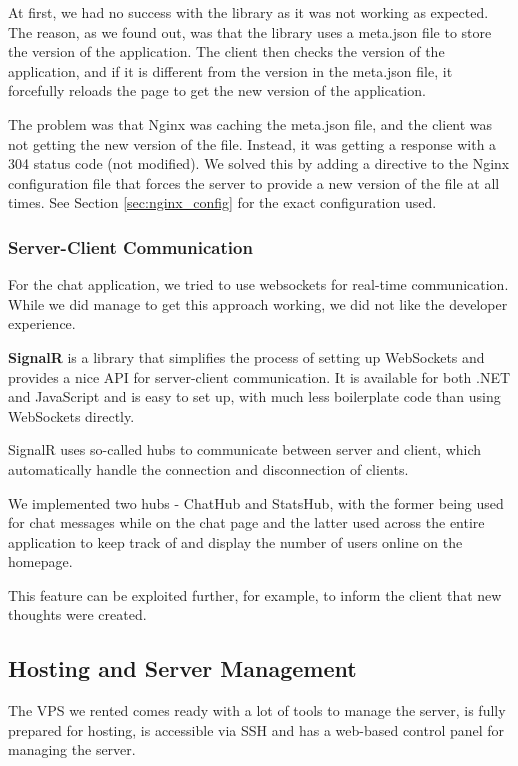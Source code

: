 At first, we had no success with the library as it was not working as expected.
The reason, as we found out, was that the library uses a meta.json file to store the version of the application.
The client then checks the version of the application, and if it is different from the version in the meta.json file,
it forcefully reloads the page to get the new version of the application.

The problem was that Nginx was caching the meta.json file, and the client was not getting the new version of the file.
Instead, it was getting a response with a 304 status code (not modified).
We solved this by adding a directive to the Nginx configuration file that forces the server to provide a new version of the file at all times.
See Section \ref{sec:nginx_config} for the exact configuration used.

\subsubsection{Server-Client Communication}
\label{sec:server_client_communication}
For the chat application, we tried to use \gls{websockets} for real-time communication.
While we did manage to get this approach working, we did not like the developer experience.

\textbf{SignalR} is a library that simplifies the process of setting up WebSockets and provides a nice API for server-client communication.
It is available for both .NET and JavaScript and is easy to set up, with much less boilerplate code than using WebSockets directly.

SignalR uses so-called hubs to communicate between server and client, which automatically handle
the connection and disconnection of clients.

We implemented two hubs - ChatHub and StatsHub, with the former being used for chat messages while on the chat page
and the latter used across the entire application to keep track of and display the number of users online on the homepage.

This feature can be exploited further, for example, to inform the client that new thoughts were created.

\subsection{Hosting and Server Management}
\label{sec:hosting}

The VPS we rented comes ready with a lot of tools to manage the server, is fully prepared for hosting,
is accessible via SSH and has a web-based control panel for managing the server.

